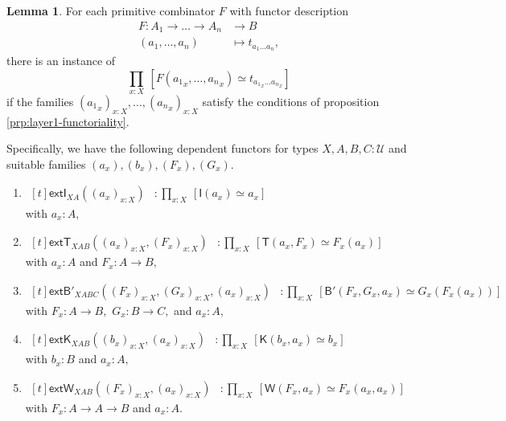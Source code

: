 \documentclass[a4paper]{article}
\theoremstyle{definition}
\newtheorem{lemma}[definition]{Lemma}
\theoremstyle{remark}
\renewcommand{\equiv}{\simeq}
\newcommand{\U}{\mathcal{U}}
\newcommand{\nm}{\mathsf}
\newcommand{\combinator}{\nm}
\newcommand{\idFun}{\combinator{I}}
\newcommand{\revAppFun}{\combinator{T}}
\newcommand{\constFun}{\combinator{K}}
\newcommand{\compFun}{\combinator{B'}}
\newcommand{\dupFun}{\combinator{W}}
\newcommand{\idFunExt}{\nm{extI}}
\newcommand{\revAppFunExt}{\nm{extT}}
\newcommand{\compFunExt}{\nm{extB'}}
\newcommand{\constFunExt}{\nm{extK}}
\newcommand{\dupFunExt}{\nm{extW}}
\begin{document}
\begin{lemma}
  \label{lem:layer2-combinator-def-equiv}
  For each primitive combinator $F$ with functor description
  \begin{align*}
    F : A_1 \to \dots \to A_n &\to     B\\
        (a_1,\dots,a_n)       &\mapsto t_{a_1 \dots a_n},
  \end{align*}
  there is an instance of
  \[\prod_{x : X}\:[F({a_1}_x,\dots,{a_n}_x) \equiv t_{{a_1}_x \dots {a_n}_x}]\]
  if the families $({a_1}_x)_{x : X},\dots,({a_n}_x)_{x : X}$ satisfy the conditions of proposition
  \ref{prp:layer1-functoriality}.

  Specifically, we have the following dependent functors for types $X,A,B,C : \U$ and suitable
  families $(a_x),(b_x),(F_x),(G_x)$.
  \begin{enumerate}
    \item $\begin{aligned}[t]
      \idFunExt_{XA}((a_x)_{x : X}) &: \prod_{x : X}\:[\idFun(a_x) \equiv a_x]
    \end{aligned}$\\
    with $a_x : A,$
    \item $\begin{aligned}[t]
      \revAppFunExt_{XAB}((a_x)_{x : X},(F_x)_{x : X}) &: \prod_{x : X}\:[\revAppFun(a_x,F_x) \equiv F_x(a_x)]
    \end{aligned}$\\
    with $a_x : A$ and $F_x : A \to B,$
    \item $\begin{aligned}[t]
      \compFunExt_{XABC}((F_x)_{x : X},(G_x)_{x : X},(a_x)_{x : X}) &: \prod_{x : X}\:[\compFun(F_x,G_x,a_x) \equiv G_x(F_x(a_x))]
    \end{aligned}$\\
    with $F_x : A \to B,$ $G_x : B \to C,$ and $a_x :A,$
    \item $\begin{aligned}[t]
      \constFunExt_{XAB}((b_x)_{x : X},(a_x)_{x : X}) &: \prod_{x : X}\:[\constFun(b_x,a_x) \equiv b_x]
    \end{aligned}$\\
    with $b_x : B$ and $a_x : A,$
    \item $\begin{aligned}[t]
      \dupFunExt_{XAB}((F_x)_{x : X},(a_x)_{x : X}) &: \prod_{x : X}\:[\dupFun(F_x,a_x) \equiv F_x(a_x,a_x)]
    \end{aligned}$\\
    with $F_x : A \to A \to B$ and $a_x : A.$
  \end{enumerate}
\end{lemma}
\end{document}
